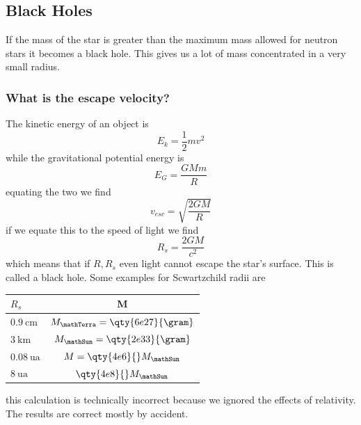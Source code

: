 \subsection{Black Holes}
If the mass of the star is greater than the maximum mass allowed for neutron stars it becomes a black hole. This gives us a lot of mass concentrated in a very small radius.
\subsubsection{What is the escape velocity?}
The kinetic energy of an object is
\begin{equation}
    E_k = \frac{1}{2}mv^2
\end{equation}
while the gravitational potential energy is
\begin{equation}
    E_G = \frac{GMm}{R}
\end{equation}
equating the two we find
\begin{equation}
    v_{esc} = \sqrt{\frac{2GM}{R}}
\end{equation}
if we equate this to the speed of light we find
\begin{equation}
    R_s = \frac{2GM}{c^2}
\end{equation}
which means that if \(R,R_s\) even light cannot escape the star's surface. This is called a black hole. Some examples for Scwartzchild radii are
\begin{table}[!htb]
    \centering
    \begin{tabular}{l|c}
        \(R_s\) & M \\
        \hline
        \(\qty{0.9}{\centi\meter}\) & \(M_\mathTerra = \qty{6e27}{\gram}\) \\
        \(\qty{3}{\kilo\meter}\) & \(M_\mathSun = \qty{2e33}{\gram}\) \\
        \(\qty{0.08}{\astronomicalunit}\) & \(M = \qty{4e6}{}M_\mathSun \) \\
        \(\qty{8}{\astronomicalunit}\) & \(\qty{4e8}{} M_\mathSun \)
    \end{tabular}
\end{table}
this calculation is technically incorrect because we ignored the effects of relativity. The results are correct mostly by accident.
